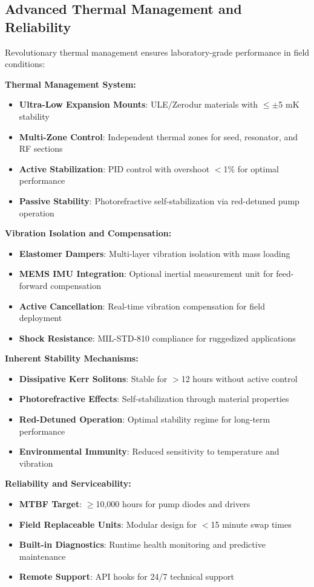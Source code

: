 \documentclass[11pt,a4paper]{article}
\begin{document}
\subsection{Advanced Thermal Management and Reliability}
Revolutionary thermal management ensures laboratory-grade performance in field conditions:

\textbf{Thermal Management System:}
\begin{itemize}
\item \textbf{Ultra-Low Expansion Mounts}: ULE/Zerodur materials with $\leq\pm$5 mK stability
\item \textbf{Multi-Zone Control}: Independent thermal zones for seed, resonator, and RF sections
\item \textbf{Active Stabilization}: PID control with overshoot $<$1\% for optimal performance
\item \textbf{Passive Stability}: Photorefractive self-stabilization via red-detuned pump operation
\end{itemize}

\textbf{Vibration Isolation and Compensation:}
\begin{itemize}
\item \textbf{Elastomer Dampers}: Multi-layer vibration isolation with mass loading
\item \textbf{MEMS IMU Integration}: Optional inertial measurement unit for feed-forward compensation
\item \textbf{Active Cancellation}: Real-time vibration compensation for field deployment
\item \textbf{Shock Resistance}: MIL-STD-810 compliance for ruggedized applications
\end{itemize}

\textbf{Inherent Stability Mechanisms:}
\begin{itemize}
\item \textbf{Dissipative Kerr Solitons}: Stable for $>$12 hours without active control
\item \textbf{Photorefractive Effects}: Self-stabilization through material properties
\item \textbf{Red-Detuned Operation}: Optimal stability regime for long-term performance
\item \textbf{Environmental Immunity}: Reduced sensitivity to temperature and vibration
\end{itemize}

\textbf{Reliability and Serviceability:}
\begin{itemize}
\item \textbf{MTBF Target}: $\geq$10,000 hours for pump diodes and drivers
\item \textbf{Field Replaceable Units}: Modular design for $<$15 minute swap times
\item \textbf{Built-in Diagnostics}: Runtime health monitoring and predictive maintenance
\item \textbf{Remote Support}: API hooks for 24/7 technical support
\end{itemize}
\end{document}
